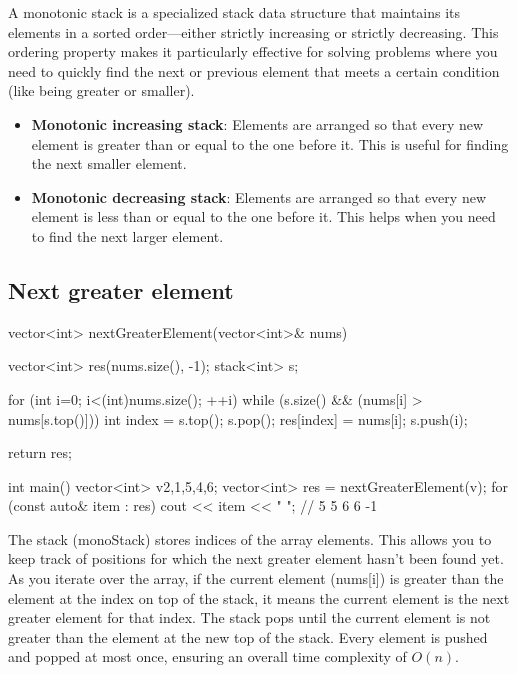 \documentclass{report}
\begin{document}
    \pagebreak 
    \bigbreak \noindent 
    A monotonic stack is a specialized stack data structure that maintains its elements in a sorted order—either strictly increasing or strictly decreasing. This ordering property makes it particularly effective for solving problems where you need to quickly find the next or previous element that meets a certain condition (like being greater or smaller).
    \begin{itemize}
        \item \textbf{Monotonic increasing stack}: Elements are arranged so that every new element is greater than or equal to the one before it. This is useful for finding the next smaller element.
        \item \textbf{Monotonic decreasing stack}: Elements are arranged so that every new element is less than or equal to the one before it. This helps when you need to find the next larger element.
    \end{itemize}
    \bigbreak \noindent 
    \subsection{Next greater element}
    \bigbreak \noindent 
    \begin{cppcode}
        vector<int> nextGreaterElement(vector<int>& nums) {
            vector<int> res(nums.size(), -1);
            stack<int> s;

            for (int i=0; i<(int)nums.size(); ++i) {
            while (s.size() && (nums[i] > nums[s.top()])) {
                int index = s.top();
                s.pop();
                res[index] = nums[i];
            }
            s.push(i);
        }

        return res;
    }
    int main() {
        vector<int> v{2,1,5,4,6};
        vector<int> res = nextGreaterElement(v);
        for (const auto& item : res) cout << item << " ";
        // 5 5 6 6 -1
    }
    \end{cppcode}
    \bigbreak \noindent 
    The stack (monoStack) stores indices of the array elements. This allows you to keep track of positions for which the next greater element hasn't been found yet.
    \bigbreak \noindent 
    As you iterate over the array, if the current element (nums[i]) is greater than the element at the index on top of the stack, it means the current element is the next greater element for that index. The stack pops until the current element is not greater than the element at the new top of the stack.
    \bigbreak \noindent 
    Every element is pushed and popped at most once, ensuring an overall time complexity of $O(n)$.
\end{document}
